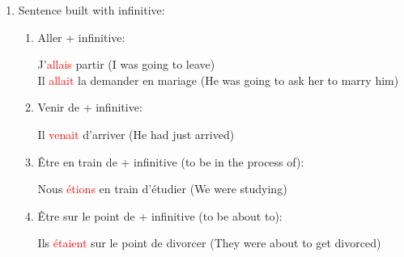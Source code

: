 \documentclass{book}
\begin{document}
\begin{enumerate}
    \item Sentence built with infinitive:
    \begin{enumerate}

        \item Aller + infinitive:
        \begin{center}
            J'\textcolor{red}{allais} partir (I was going to leave) \\
            Il \textcolor{red}{allait} la demander en mariage (He was going to ask her to marry him)
        \end{center}

        \item Venir de + infinitive:
        \begin{center}
            Il \textcolor{red}{venait} d'arriver (He had just arrived)
        \end{center}

        \item Être en train de + infinitive (to be in the process of):
        \begin{center}
            Nous \textcolor{red}{étions} en train d'étudier (We were studying)
        \end{center}

        \item Être sur le point de + infinitive (to be about to):
        \begin{center}
            Ils \textcolor{red}{étaient} sur le point de divorcer (They were about to get divorced)
        \end{center}
    \end{enumerate}
\end{enumerate}
\end{document}
